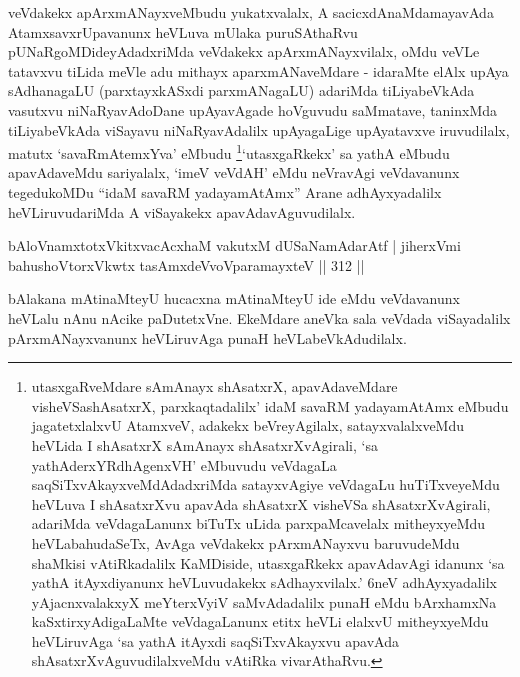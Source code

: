 \begin{artha}
veVdakekx apArxmANayxveMbudu yukatxvalalx, A sacicxdAnaMdamayavAda AtamxsavxrUpavanunx heVLuva mUlaka puruSAthaRvu pUNaRgoMDideyAdadxriMda veVdakekx apArxmANayxvilalx, oMdu veVLe tatavxvu tiLida meVle adu mithayx aparxmANaveMdare - idaraMte elAlx upAya sAdhanagaLU (parxtayxkASxdi parxmANagaLU) adariMda tiLiyabeVkAda vasutxvu niNaRyavAdoDane upAyavAgade hoVguvudu saMmatave, taninxMda tiLiyabeVkAda viSayavu niNaRyavAdalilx upAyagaLige upAyatavxve iruvudilalx, matutx `savaRmAtemxYva' eMbudu \footnote{utasxgaRveMdare sAmAnayx shAsatxrX, apavAdaveMdare visheVSashAsatxrX, parxkaqtadalilx' idaM savaRM yadayamAtAmx eMbudu jagatetxlalxvU AtamxveV, adakekx beVreyAgilalx, satayxvalalxveMdu heVLida I shAsatxrX sAmAnayx shAsatxrXvAgirali, `sa yathA\s derxYRdhAgenxVH' eMbuvudu veVdagaLa saqSiTxvAkayxveMdAdadxriMda satayxvAgiye veVdagaLu huTiTxveyeMdu heVLuva I shAsatxrXvu apavAda shAsatxrX visheVSa shAsatxrXvAgirali, adariMda veVdagaLanunx biTuTx uLida parxpaMcavelalx mitheyxyeMdu heVLabahudaSeTx, AvAga veVdakekx pArxmANayxvu baruvudeMdu shaMkisi vAtiRkadalilx KaMDiside, utasxgaRkekx apavAdavAgi idanunx `sa yathA itAyxdiyanunx heVLuvudakekx sAdhayxvilalx.' 6neV adhAyxyadalilx yAjacnxvalakxyX meYterxVyiV saMvAdadalilx punaH eMdu bArxhamxNa kaSxtirxyAdigaLaMte veVdagaLanunx etitx heVLi elalxvU mitheyxyeMdu heVLiruvAga `sa yathA itAyxdi saqSiTxvAkayxvu apavAda shAsatxrXvAguvudilalxveMdu vAtiRka vivarAthaRvu.}`utasxgaRkekx' sa yathA eMbudu apavAdaveMdu sariyalalx, `imeV veVdAH' eMdu neVravAgi veVdavanunx tegedukoMDu ``idaM savaRM yadayamAtAmx'' Arane adhAyxyadalilx heVLiruvudariMda A viSayakekx apavAdavAguvudilalx.
\end{artha}


\begin{shl}
bAloVnamxtotxVkitxvacAcxhaM vakutxM dUSaNamAdarAtf |
jiherxVmi bahushoV\s torxVkwtx tasAmxdeVvoVparamayxteV \hfill || 312 ||
\end{shl}

\begin{artha}
bAlakana mAtinaMteyU hucacxna mAtinaMteyU ide eMdu veVdavanunx heVLalu nAnu nAcike paDutetxVne. EkeMdare aneVka sala veVdada viSayadalilx pArxmANayxvanunx heVLiruvAga punaH heVLabeVkAdudilalx.
\end{artha}


